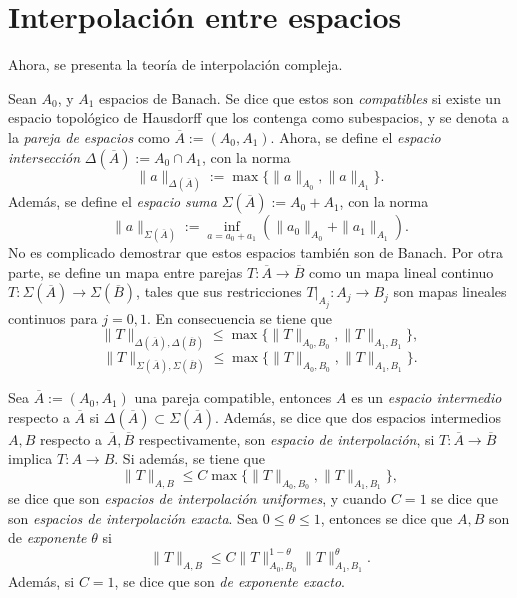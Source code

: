 \section{Interpolación entre espacios}
Ahora, se presenta la teoría de interpolación compleja.
\begin{definition}
	Sean $A_0$, y $A_1$ espacios de Banach. Se dice que estos son \textit{compatibles} si existe un espacio topológico de Hausdorff que los contenga como subespacios, y se denota a la \textit{pareja de espacios} como $\overline{A}:=(A_0, A_1)$. Ahora, se define el \textit{espacio intersección} $\Delta(\overline{A}):=A_0\cap A_1$, con la norma 
	\begin{equation*}
		\|a\|_{\Delta(\overline{A})} := \max \{\|a\|_{A_0}, \|a\|_{A_1}\}.
	\end{equation*} 
	Además, se define el \textit{espacio suma} $\Sigma(\overline{A}):=A_0+A_1$, con la norma
	\begin{equation*}
		\|a\|_{\Sigma(\overline{A})} := \inf_{a=a_0+a_1} (\|a_0\|_{A_0}+\|a_1\|_{A_1}).
	\end{equation*}
	No es complicado demostrar que estos espacios también son de Banach. Por otra parte, se define un mapa entre parejas $T:\overline{A}\to\overline{B}$ como un mapa lineal continuo $T:\Sigma(\overline{A})\to\Sigma(\overline{B})$, tales que sus restricciones  $T|_{A_j}:A_j\to B_j$ son mapas lineales continuos para $j=0,1$. En consecuencia se tiene que 
	\begin{equation*}
		\|T\|_{\Delta(\overline{A}), \Delta(\overline{B})} \leq \max\{\|T\|_{A_0, B_0}, \|T\|_{A_1, B_1}\},
	\end{equation*}
	\begin{equation*}
		\|T\|_{\Sigma(\overline{A}), \Sigma(\overline{B})} \leq \max\{\|T\|_{A_0, B_0}, \|T\|_{A_1, B_1}\}.
	\end{equation*}
\end{definition}
\begin{definition}
	Sea $\overline{A}:=(A_0, A_1)$ una pareja compatible, entonces $A$ es un \textit{espacio intermedio} respecto a $\overline{A}$ si $\Delta(\overline{A}) \subset \Sigma(\overline{A})$. Además, se dice que dos espacios intermedios $A, B$ respecto a $\overline{A},\overline{B}$ respectivamente, son \textit{espacio de interpolación}, si  $T:\overline{A}\to\overline{B}$ implica $T:A\to B$. Si además, se tiene que 
	\begin{equation*}
		\|T\|_{A, B} \leq C \max\{\|T\|_{A_0, B_0}, \|T\|_{A_1, B_1}\},
	\end{equation*}
	se dice que son \textit{espacios de interpolación uniformes}, y cuando $C=1$ se dice que son \textit{espacios de interpolación exacta}. Sea $0\leq\theta\leq1$, entonces se dice que $A, B$ son de \textit{exponente} $\theta$ si 
	\begin{equation*}
		\|T\|_{A, B} \leq C \|T\|_{A_0, B_0}^{1-\theta} \|T\|_{A_1, B_1}^{\theta}.
	\end{equation*}
	Además, si $C=1$, se dice que son \textit{de exponente exacto}.
\end{definition}

